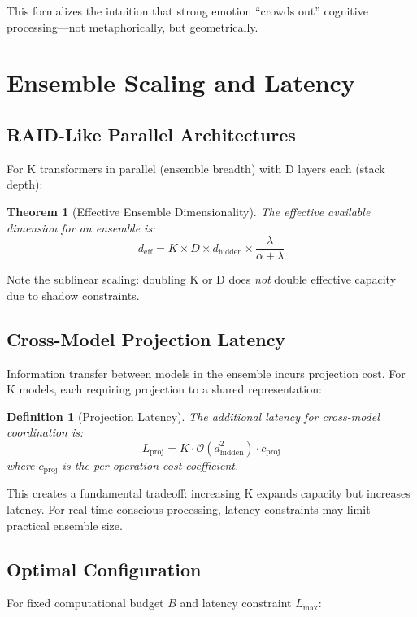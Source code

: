 \documentclass[reprint, amsmath, amssymb, aps, prd]{revtex4-2}
\newtheorem{definition}{Definition}[section]
\newtheorem{theorem}{Theorem}[section]
\begin{document}
This formalizes the intuition that strong emotion ``crowds out'' cognitive processing---not metaphorically, but geometrically.

\section{Ensemble Scaling and Latency}

\subsection{RAID-Like Parallel Architectures}

For K transformers in parallel (ensemble breadth) with D layers each (stack depth):

\begin{theorem}[Effective Ensemble Dimensionality]
The effective available dimension for an ensemble is:
\[
d_{\text{eff}} = K \times D \times d_{\text{hidden}} \times \frac{\lambda}{\alpha + \lambda}
\]
\end{theorem}

Note the sublinear scaling: doubling K or D does \textit{not} double effective capacity due to shadow constraints.

\subsection{Cross-Model Projection Latency}

Information transfer between models in the ensemble incurs projection cost. For K models, each requiring projection to a shared representation:

\begin{definition}[Projection Latency]
The additional latency for cross-model coordination is:
\[
L_{\text{proj}} = K \cdot \mathcal{O}(d_{\text{hidden}}^2) \cdot c_{\text{proj}}
\]
where $c_{\text{proj}}$ is the per-operation cost coefficient.
\end{definition}

This creates a fundamental tradeoff: increasing K expands capacity but increases latency. For real-time conscious processing, latency constraints may limit practical ensemble size.

\subsection{Optimal Configuration}

For fixed computational budget $B$ and latency constraint $L_{\text{max}}$:
\end{document}
